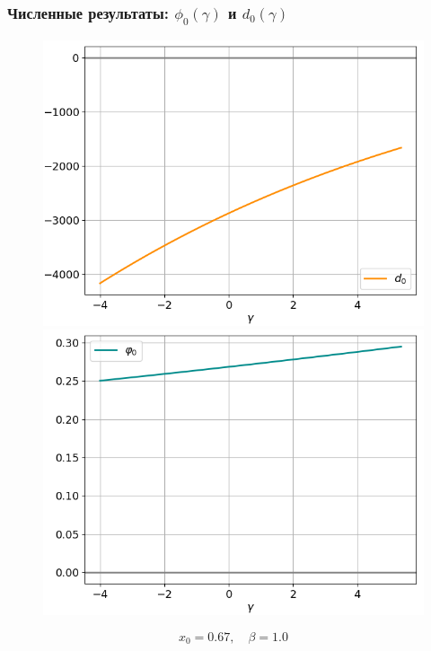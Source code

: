 \documentclass[fullscreen=true, unicode, bookmarks=false]{beamer}
\begin{document}
\begin{frame}
\frametitle{ Численные результаты: $ \phi_0(\gamma) $ и $ d_0(\gamma) $ }

\begin{figure} 
\begin{minipage}[h]{0.49\linewidth}
\begin{center}
\includegraphics[scale=0.35]{oscillating_d0_x0=0,67,beta=1,0.png}
\end{center}
\end{minipage} 
\hfill
\begin{minipage}[h]{0.49\linewidth}
\begin{center}
\includegraphics[scale=0.35]{oscillating_phi0_x0=0,67,beta=1,0.png}
\end{center}
\end{minipage} 
\end{figure}

$$ x_0 = 0.67, \quad \beta=1.0 $$

\end{frame}
\end{document}
